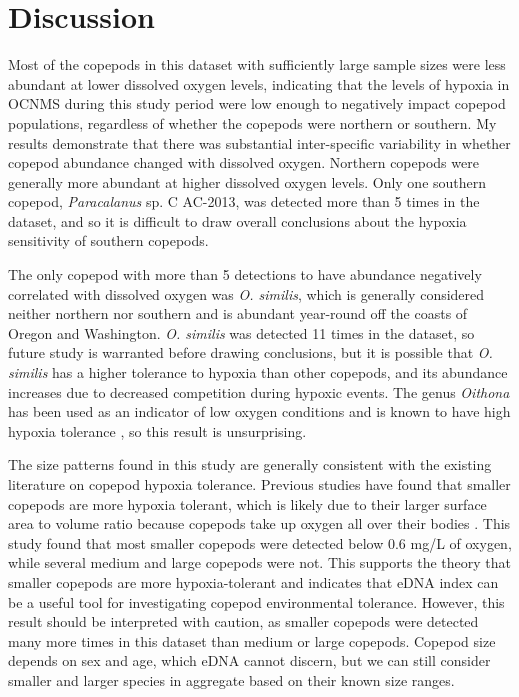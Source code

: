 \documentclass[12pt,twoside]{reedthesis}
\begin{document}
\begin{figure}[!h]
\begin{center}
			\label{ParacalanusScatter}
		\end{center}
	\end{figure} 
	
	
	\chapter{Discussion}
	
	Most of the copepods in this dataset with sufficiently large sample sizes were less abundant at lower dissolved oxygen levels, indicating that the levels of hypoxia in OCNMS during this study period were low enough to negatively impact copepod populations, regardless of whether the copepods were northern or southern. My results demonstrate that there was substantial inter-specific variability in whether copepod abundance changed with dissolved oxygen. Northern copepods were generally more abundant at higher dissolved oxygen levels. Only one southern copepod, \textit{Paracalanus} sp. C AC-2013, was detected more than 5 times in the dataset, and so it is difficult to draw overall conclusions about the hypoxia sensitivity of southern copepods. 
	
	The only copepod with more than 5 detections to have abundance negatively correlated with dissolved oxygen was \textit{O. similis}, which is generally considered neither northern nor southern and is abundant year-round off the coasts of Oregon and Washington. \textit{O. similis} was detected 11 times in the dataset, so future study is warranted before drawing conclusions, but it is possible that \textit{O. similis} has a higher tolerance to hypoxia than other copepods, and its abundance increases due to decreased competition during hypoxic events. The genus \textit{Oithona} has been used as an indicator of low oxygen conditions \autocite{Richard2001} and is known to have high hypoxia tolerance \autocite{Roman1993}, so this result is unsurprising. 
	
	The size patterns found in this study are generally consistent with the existing literature on copepod hypoxia tolerance. Previous studies have found that smaller copepods are more hypoxia tolerant, which is likely due to their larger surface area to volume ratio because copepods take up oxygen all over their bodies \autocite{Portner2010, Roman2019}. This study found that most smaller copepods were detected below 0.6 mg/L of oxygen, while several medium and large copepods were not. This supports the theory that smaller copepods are more hypoxia-tolerant and indicates that eDNA index can be a useful tool for investigating copepod environmental tolerance. However, this result should be interpreted with caution, as smaller copepods were detected many more times in this dataset than medium or large copepods. Copepod size depends on sex and age, which eDNA cannot discern, but we can still consider smaller and larger species in aggregate based on their known size ranges. 
	
\end{document}

